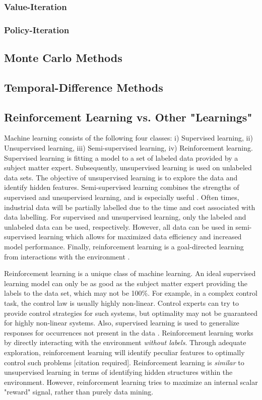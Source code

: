 \subsubsection{Value-Iteration}
\subsubsection{Policy-Iteration}
\subsection{Monte Carlo Methods}
\subsection{Temporal-Difference Methods}
\subsection{Reinforcement Learning vs. Other "Learnings"}

Machine learning consists of the following four classes: i) Supervised learning, ii) Unsupervised learning, iii) Semi-supervised learning, iv) Reinforcement learning.  Supervised learning is fitting a model to a set of labeled data provided by a subject matter expert.  Subsequently, unsupervised learning is used on unlabeled data sets.  The objective of unsupervised learning is to explore the data and identify hidden features. Semi-supervised learning combines the strengths of supervised and unsupervised learning, and is especially useful \cite{machine_learning}.  Often times, industrial data will be partially labelled due to the time and cost associated with data labelling.  For supervised and unsupervised learning, only the labeled and unlabeled data can be used, respectively.  However, all data can be used in semi-supervised learning which allows for maximized data efficiency and increased model performance. Finally, reinforcement learning is a goal-directed learning from interactions with the environment \cite{sutton}.

Reinforcement learning is a unique class of machine learning.  An ideal supervised learning model can only be as good as the subject matter expert providing the labels to the data set, which may not be 100\%.  For example, in a complex control task, the control law is usually highly non-linear. Control experts can try to provide control strategies for such systems, but optimality may not be guaranteed for highly non-linear systems. Also, supervised learning is used to generalize responses for occurrences not present in the data \cite{sutton}.  Reinforcement learning works by directly interacting with the environment \textit{without labels}. Through adequate exploration, reinforcement learning will identify peculiar features to optimally control such problems [citation required].  Reinforcement learning is \textit{similar} to unsupervised learning in terms of identifying hidden structures within the environment.  However, reinforcement learning tries to maximize an internal scalar "reward" signal, rather than purely data mining.

